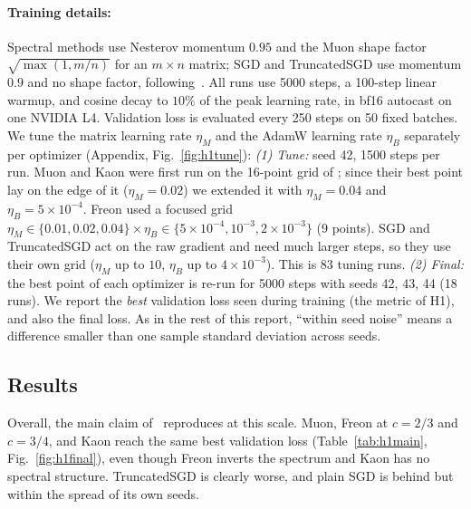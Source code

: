 \paragraph{Training details:}
Spectral methods use Nesterov momentum $0.95$ and the Muon shape factor $\sqrt{\max(1,m/n)}$ for an $m\times n$ matrix; SGD and TruncatedSGD use momentum $0.9$ and no shape factor, following~\cite{shumaylov}.
All runs use 5000 steps, a 100-step linear warmup, and cosine decay to $10\%$ of the peak learning rate, in bf16 autocast on one NVIDIA L4. Validation loss is evaluated every 250 steps on 50 fixed batches.
We tune the matrix learning rate $\eta_M$ and the AdamW learning rate $\eta_B$ separately per optimizer (Appendix, Fig.~\ref{fig:h1tune}):
\emph{(1) Tune:} seed 42, 1500 steps per run. Muon and Kaon were first run on the 16-point grid of \cite{shumaylov}; since their best point lay on the edge of it
($\eta_M=0.02$) we extended it with $\eta_M=0.04$ and $\eta_B=5\!\times\!10^{-4}$. Freon used a focused grid $\eta_M\in\{0.01,0.02,0.04\}\times\eta_B\in\{5\!\times\!10^{-4},10^{-3},2\!\times\!10^{-3}\}$ (9 points).
SGD and TruncatedSGD act on the raw gradient and need much larger steps, so they use their own grid ($\eta_M$ up to $10$, $\eta_B$ up to $4\times10^{-3}$).
This is 83 tuning runs. \emph{(2) Final:} the best point of each optimizer is re-run for 5000 steps with seeds 42, 43, 44 (18 runs).
We report the \emph{best} validation loss seen during training (the metric of H1), and also the final loss.
As in the rest of this report, ``within seed noise'' means a difference smaller than one sample standard deviation across seeds.

\subsection{Results}

Overall, the main claim of~\cite{shumaylov} reproduces at this scale. Muon, Freon at $c=2/3$ and $c=3/4$, and Kaon reach the same best validation loss (Table~\ref{tab:h1main}, Fig.~\ref{fig:h1final}), even though Freon inverts the spectrum and Kaon has no
spectral structure. TruncatedSGD is clearly worse, and plain SGD is behind but within the spread of its own seeds.

\begin{table}[t]
  \centering
  \caption{Hypothesis 1, Shakespeare-char: validation loss (mean $\pm$ sample std over seeds 42/43/44) at the tuned learning rates, 5000 steps. ``Best'' is the lowest validation loss during training, ``final'' the loss at step 5000.
  $\Delta$ is the mean best-loss gap to Muon and $p$ a Welch $t$-test against Muon on the best loss (3 seeds each, so low power). Time is the wall-clock of one 5000-step run on an L4 (Freon: eigendecomposition implementation).}
  \label{tab:h1main}
  \resizebox{\textwidth}{!}{}
\end{table}

